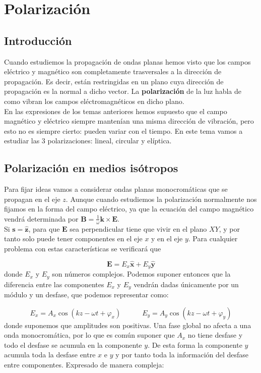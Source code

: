 \documentclass[12pt,a4paper]{article}
\newcommand{\tquad}{\quad \quad \quad}
\newcommand{\Bn}{\mathbf{B}}
\newcommand{\En}{\mathbf{E}}
\newcommand{\kn}{\mathbf{k}}
\newcommand{\sn}{\mathbf{s}}
\newcommand{\hnz}{\hat{\mathbf{z}}}
\newcommand{\hnx}{\hat{\mathbf{x}}}
\newcommand{\hny}{\hat{\mathbf{y}}}
\numberwithin{equation}{section}
\numberwithin{figure}{section}
\begin{document}
\newpage

\section{Polarización}

\subsection{Introducción}

Cuando estudiemos la propagación de ondas planas hemos visto que los campos eléctrico y magnético son completamente trasversales a la dirección de propagación. Es decir, están restringidas en un plano cuya dirección de propagación es la normal a dicho vector. La \textbf{polarización} de la luz habla de como vibran los campos eléctromagnéticos en dicho plano. \\

En las expresiones de los temas anteriores hemos supuesto que el campo magnético y eléctrico siempre mantenían una misma dirección de vibración, pero esto no es siempre cierto: pueden variar con el tiempo. En este tema vamos a estudiar las 3 polarizaciones: lineal, circular y elíptica.

\subsection{Polarización en medios isótropos}

Para fijar ideas vamos a considerar ondas planas monocromáticas que se propagan en el eje $z$. Aunque cuando estudiemos la polarización normalmente nos fijamos en la forma del campo eléctrico, ya que la ecuación del campo magnético vendrá determinada por $\Bn = \frac{1}{\omega} \kn \times \En$.  \\

Si $\sn = \hnz$, para que $\En$ sea perpendicular tiene que vivir en el plano $XY$, y por tanto solo puede tener componentes en el eje $x$ y en el eje $y$. Para cualquier problema con estas características se verificará que

\begin{equation}
\En = E_x \hnx + E_y \hny
\end{equation}
donde $E_x$ y $E_y$ son números complejos. Podemos suponer entonces que la diferencia entre las componentes $E_x$ y $E_y$ vendrán dadas únicamente por un módulo y un desfase, que podemos representar como:

\begin{equation}
E_x = A_x \cos (kz-\omega t + \varphi_x) \tquad E_y = A_y \cos (kz - \omega t + \varphi_y)
\end{equation}
donde suponemos que amplitudes son positivas. Una fase global no afecta a una onda monocromática, por lo que es común suponer que $A_x$ no tiene desfase y todo el desfase se acumula en la componente $y$. De esta forma la componente $y$ acumula toda la desfase entre $x$ e $y$ y por tanto toda la información del desfase entre componentes. Expresado de manera compleja:
\end{document}
